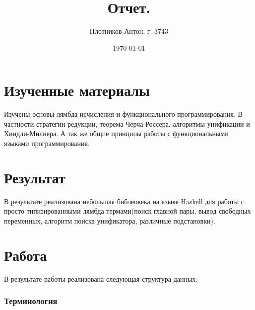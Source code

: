 \documentclass[a4paper,12pt]{article}
\author{Плотников Антон, г. 3743}
\title{Отчет.}
\date{\today}
\begin{document}
\maketitle

\section*{Изученные материалы}
Изучены основы лямбда исчисления и функционального программирования. В частности стратегии редукции, теорема Чёрча-Россера, алгоритмы унификации и Хиндли-Милнера. А так же общие принципы работы с функциональными языками программирования.

\section*{Результат}
В результате реализована небольшая библеокека на языке Haskell для работы с просто типизированными лямбда термами(поиск главной пары, вывод свободных переменных, алгоритм поиска унификатора, различные подстановки). 

\section*{Работа}
В результате работы реализована следующая структура данных:
\subsubsection*{Терминология}
\end{document}
